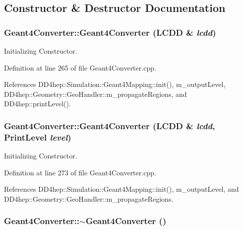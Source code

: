 \subsection{Constructor \& Destructor Documentation}
\hypertarget{class_d_d4hep_1_1_simulation_1_1_geant4_converter_aaed2b0700c7bdbc747a7c5cf0b0e4b0e}{
\subsubsection[{Geant4Converter}]{\setlength{\rightskip}{0pt plus 5cm}Geant4Converter::Geant4Converter ({\bf LCDD} \& {\em lcdd})}}
\label{class_d_d4hep_1_1_simulation_1_1_geant4_converter_aaed2b0700c7bdbc747a7c5cf0b0e4b0e}


Initializing Constructor. 

Definition at line 265 of file Geant4Converter.cpp.

References DD4hep::Simulation::Geant4Mapping::init(), m\_\-outputLevel, DD4hep::Geometry::GeoHandler::m\_\-propagateRegions, and DD4hep::printLevel().\hypertarget{class_d_d4hep_1_1_simulation_1_1_geant4_converter_a102d0182df67257e795fde27d685b830}{
\subsubsection[{Geant4Converter}]{\setlength{\rightskip}{0pt plus 5cm}Geant4Converter::Geant4Converter ({\bf LCDD} \& {\em lcdd}, \/  {\bf PrintLevel} {\em level})}}
\label{class_d_d4hep_1_1_simulation_1_1_geant4_converter_a102d0182df67257e795fde27d685b830}


Initializing Constructor. 

Definition at line 273 of file Geant4Converter.cpp.

References DD4hep::Simulation::Geant4Mapping::init(), m\_\-outputLevel, and DD4hep::Geometry::GeoHandler::m\_\-propagateRegions.\hypertarget{class_d_d4hep_1_1_simulation_1_1_geant4_converter_a7f6a35aaa5aa5609700e21a061c142e3}{
\subsubsection[{$\sim$Geant4Converter}]{\setlength{\rightskip}{0pt plus 5cm}Geant4Converter::$\sim$Geant4Converter ()}}
\label{class_d_d4hep_1_1_simulation_1_1_geant4_converter_a7f6a35aaa5aa5609700e21a061c142e3}


